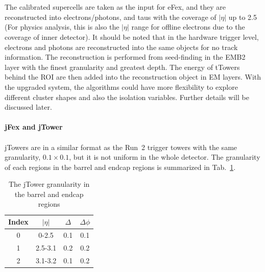 \noindent
\\
\\The calibrated supercells are taken as the input for eFex, and they are reconstructed into electrons/photons, and taus with the coverage of $|\eta|$ up to 2.5 (For physics analysis, this is also the $|\eta|$ range for offline electrons due to the coverage of inner detector). It should be noted that in the hardware trigger level, electrons and photons are reconstructed into the same objects for no track information. The reconstruction is performed from seed-finding in the EMB2 layer with the finest granularity and greatest depth. The energy of tTowers behind the ROI are then added into the reconstruction object in EM layers. With the upgraded system, the algorithms could have more flexibility to explore different cluster shapes and also the isolation variables. Further details will be discussed later. 
\\
\\{\bf jFex and jTower}
\\
\\jTowers are in a similar format as the Run~2 trigger towers with the same granularity, $0.1\times0.1$, but it is not uniform in the whole detector. The granularity of each regions in the barrel and endcap regions is summarized in Tab.~\ref{Tab:granularity_jT}.
\begin{table}[h]
	\caption{The jTower granularity in the barrel and endcap regions}
	\renewcommand{\arraystretch}{1.3}
	\centering
	\begin{tabular}{| c | c | c | c | }
		\hline
		\hline
		Index      &    $|\eta|$        &     $\Delta$     & $\Delta\phi$   \\
		\hline
		0          &     0-2.5          & 0.1                          &  0.1                          \\
		\hline
		1          &     2.5-3.1           & 0.2                          &  0.2                         \\
		\hline
		2      &     3.1-3.2       & 0.1                       &  0.2                       \\
		\hline
		\hline
	\end{tabular}
	\label{Tab:granularity_jT}
\end{table}

